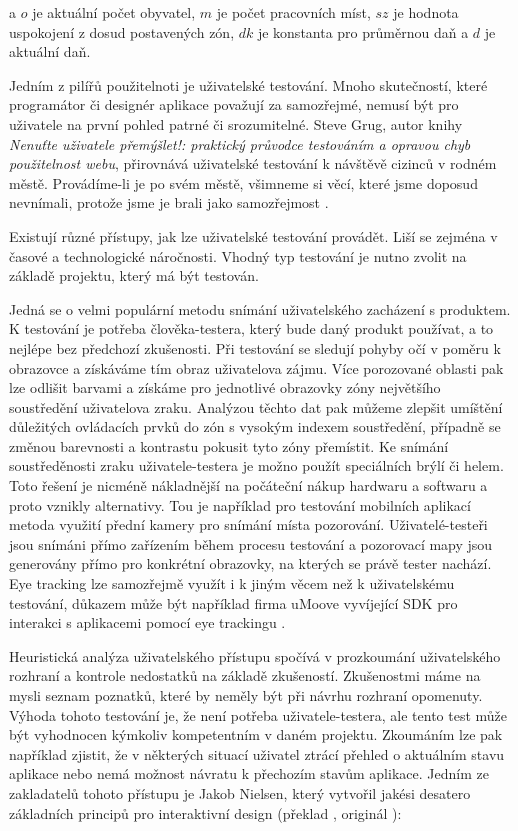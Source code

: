 \documentclass[twoside,12pt]{article}
\begin{document}
a $o$ je aktuální počet obyvatel, $m$ je počet pracovních míst, $sz$ je hodnota uspokojení z dosud postavených zón, $dk$ je konstanta pro průměrnou daň a $d$ je aktuální daň.

\newpage

Jedním z pilířů použitelnoti je uživatelské testování. Mnoho skutečností, které programátor či designér aplikace považují za samozřejmé, nemusí být pro uživatele na první pohled patrné či srozumitelné. Steve Grug, autor knihy \textit{Nenuťte uživatele přemýšlet!: praktický průvodce testováním a opravou chyb použitelnost webu}, přirovnává uživatelské testování k návštěvě cizinců v rodném městě. Provádíme-li je po svém městě, všimneme si věcí, které jsme doposud nevnímali, protože jsme je brali jako samozřejmost \cite{krug_steve}.

Existují různé přístupy, jak lze uživatelské testování provádět. Liší se zejména v časové a technologické náročnosti. Vhodný typ testování je nutno zvolit na základě projektu, který má být testován. 

Jedná se o velmi populární metodu snímání uživatelského zacházení s produktem. K testování je potřeba člověka-testera, který bude daný produkt používat, a to nejlépe bez předchozí zkušenosti. Při testování se sledují pohyby očí v poměru k obrazovce a získáváme tím obraz uživatelova zájmu. Více porozované oblasti pak lze odlišit barvami a získáme pro jednotlivé obrazovky zóny největšího soustředění uživatelova zraku. Analýzou těchto dat pak můžeme zlepšit umíštění důležitých ovládacích prvků do zón s vysokým indexem soustředění, případně se změnou barevnosti a kontrastu pokusit tyto zóny přemístit. Ke snímání soustředěnosti zraku uživatele-testera je možno použít speciálních brýlí či helem. Toto řešení je nicméně nákladnější na počáteční nákup hardwaru a softwaru a proto vznikly alternativy. Tou je například pro testování mobilních aplikací metoda využití přední kamery pro snímání místa pozorování. Uživatelé-testeři jsou snímáni přímo zařízením během procesu testování a pozorovací mapy jsou generovány přímo pro konkrétní obrazovky, na kterých se právě tester nachází. Eye tracking lze samozřejmě využít i k jiným věcem než k uživatelskému testování, důkazem může být například firma uMoove vyvíjející SDK pro interakci s aplikacemi pomocí eye trackingu \cite{umoove}.

Heuristická analýza uživatelského přístupu spočívá v prozkoumání uživatelského rozhraní a kontrole nedostatků na základě zkušeností. Zkušenostmi máme na mysli seznam poznatků, které by neměly být při návrhu rozhraní opomenuty. Výhoda tohoto testování je, že není potřeba uživatele-testera, ale tento test může být vyhodnocen kýmkoliv kompetentním v daném projektu. Zkoumáním lze pak například zjistit, že v některých situací uživatel ztrácí přehled o aktuálním stavu aplikace nebo nemá možnost návratu k přechozím stavům aplikace. Jedním ze zakladatelů tohoto přístupu je Jakob Nielsen, který vytvořil jakési desatero základních principů pro interaktivní design (překlad \cite{lichnovskakarberova}, originál \cite{nielsen}): 
\end{document}
